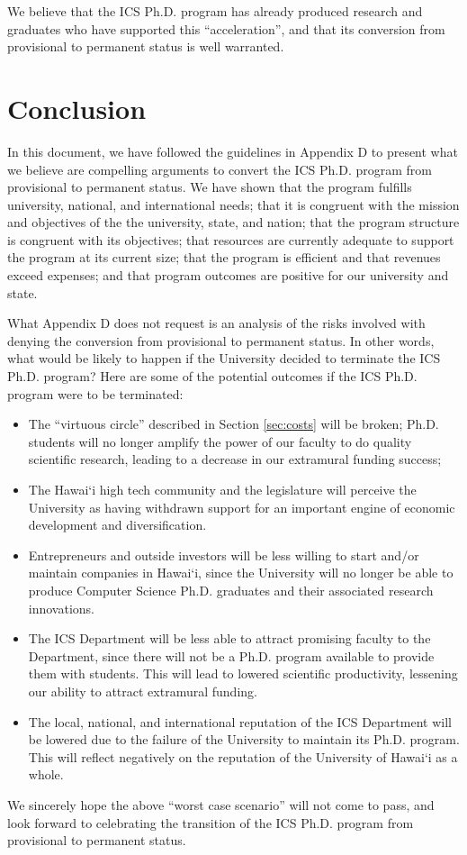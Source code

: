 \documentclass[12pt]{article}
\begin{document}
We believe that the ICS Ph.D. program has already produced research and
graduates who have supported this ``acceleration'', and that its conversion
from provisional to permanent status is well warranted.

\section{Conclusion}

In this document, we have followed the guidelines in Appendix D to present
what we believe are compelling arguments to convert the ICS Ph.D. program
from provisional to permanent status.  We have shown that the program
fulfills university, national, and international needs; that it is
congruent with the mission and objectives of the the university, state, and
nation; that the program structure is congruent with its objectives; that
resources are currently adequate to support the program at its current
size; that the program is efficient and that revenues exceed expenses; and
that program outcomes are positive for our university and state.

What Appendix D does not request is an analysis of the risks involved with
denying the conversion from provisional to permanent status. In other
words, what would be likely to happen if the University decided to
terminate the ICS Ph.D. program? Here are some of the potential outcomes if
the ICS Ph.D. program were to be terminated:

\begin{itemize}

\item The ``virtuous circle'' described in Section \ref{sec:costs} will be
  broken; Ph.D. students will no longer amplify the power of our faculty
  to do quality scientific research, leading to a decrease in our extramural
  funding success;

\item The Hawai`i high tech community and the legislature will perceive the
  University as having withdrawn support for an important engine of
  economic development and diversification.

\item Entrepreneurs and outside investors will be less willing to start
  and/or maintain companies in Hawai`i, since the University will no longer
  be able to produce Computer Science Ph.D. graduates and their associated
  research innovations.

\item The ICS Department will be less able to attract promising faculty to
  the Department, since there will not be a Ph.D. program available to
  provide them with students.  This will lead to lowered scientific
  productivity, lessening our ability to attract extramural funding.

\item The local, national, and international reputation of the ICS
  Department will be lowered due to the failure of the University to
  maintain its Ph.D. program.  This will reflect negatively on the
  reputation of the University of Hawai`i as a whole.

\end{itemize}

We sincerely hope the above ``worst case scenario'' will not come to pass,
and look forward to celebrating the transition of the ICS Ph.D. program
from provisional to permanent status. 
\end{document}

